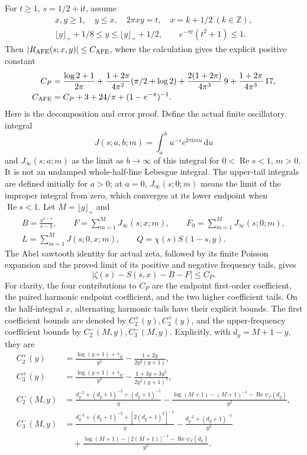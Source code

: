 \documentclass[11pt,a4paper]{article}
\numberwithin{equation}{section}
\theoremstyle{definition}
\newcommand{\Z}{\mathbb Z}
\newcommand{\dd}{\,\mathrm d}
\newcommand{\ii}{\mathrm i}
\newcommand{\Rea}{\operatorname{Re}}
\begin{document}
For $t\ge1$, $s=1/2+\ii t$, assume
\begin{gather*}
 x,y\ge1,\quad y\le x,\quad 2\pi xy=t,\quad x=k+1/2\ (k\in\Z),\\
 \lfloor y\rfloor_++1/8\le y\le\lfloor y\rfloor_++1/2,
 \qquad e^{-\pi t}(t^2+1)\le1.
\end{gather*}
Then $|R_{\rm AFE}(s;x,y)|\le C_{\rm AFE}$, where the calculation gives the
explicit positive constant
\begin{align*}
 C_P&=\frac{\log2+1}{2\pi}
 +\frac{1+2\pi}{4\pi^2}(\pi/2+\log2)
 +\frac{2(1+2\pi)}{4\pi^3}\,9
 +\frac{1+2\pi}{4\pi^3}\,17,\\
 C_{\rm AFE}&=C_P+3+24/\pi+(1-e^{-\pi})^{-1}.
\end{align*}
Here is the decomposition and error proof. Define the actual finite
oscillatory integral
\[
 J(s;a,b;m)=\int_a^b u^{-s}e^{2\pi\ii mu}\dd u
\]
and $J_\infty(s;a;m)$ as the limit as $b\to\infty$ of this integral for
$0<\Rea s<1$, $m>0$. It is not an undamped whole-half-line Lebesgue
integral.
The upper-tail integrals are defined initially for $a>0$; at $a=0$,
$J_\infty(s;0;m)$ means the limit of the improper integral from zero,
which converges at its lower endpoint when $\Rea s<1$.
Let $M=\lfloor y\rfloor_+$ and
\begin{gather*}
 B=\frac{x^{1-s}}{s-1},\qquad F=\sum_{m=1}^M J_\infty(s;x;m),\qquad
 F_0=\sum_{m=1}^M J_\infty(s;0;m),\\
 L=\sum_{m=1}^M J(s;0,x;m),\qquad Q=\chi(s)S(1-s,y).
\end{gather*}
The Abel sawtooth identity for actual zeta, followed by its finite Poisson
expansion and the proved limit of its positive and negative frequency tails,
gives
\[
 |\zeta(s)-S(s,x)-B-F|\le C_P.
\]
For clarity, the four contributions to $C_P$ are the endpoint first-order
coefficient, the paired harmonic endpoint coefficient, and the two higher
coefficient tails. On the half-integral $x$, alternating harmonic tails have
their explicit bounds. The first coefficient bounds are denoted by $C_2^+(y),C_3^+(y)$,
and the upper-frequency coefficient bounds by $C_2^-(M,y),C_3^-(M,y)$.
Explicitly, with $d_y=M+1-y$, they are
\begin{align*}
 C_2^+(y)&=\frac{\log(y+1)+\gamma_E}{y^2}
                 -\frac{1+2y}{2y^2(y+1)},\\
 C_3^+(y)&=\frac{\log(y+1)+\gamma_E}{y^3}
                 -\frac{1+3y+3y^2}{2y^3(y+1)^2},\\
 C_2^-(M,y)&=\frac{d_y^{-2}+(d_y+1)^{-2}+(d_y+1)^{-1}}{y}
 -\frac{\log(M+1)-(M+1)^{-1}-\Rea\psi_\Gamma(d_y)}{y^2},\\
 C_3^-(M,y)&=\frac{d_y^{-3}+(d_y+1)^{-3}+[2(d_y+1)^2]^{-1}}{y}
 -\frac{d_y^{-2}+(d_y+1)^{-1}}{y^2}\\
 &\quad+\frac{\log(M+1)-[2(M+1)]^{-1}-\Rea\psi_\Gamma(d_y)}{y^3}.
\end{align*}
\end{document}
